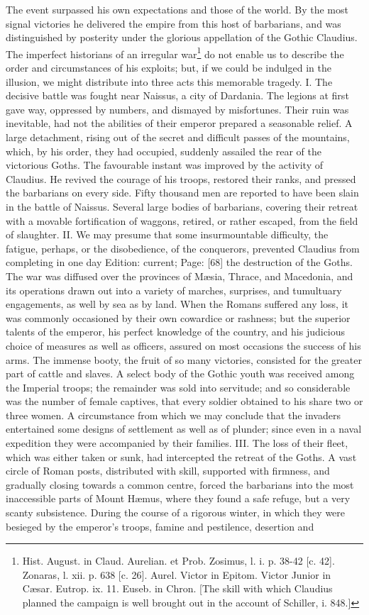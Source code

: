 The event surpassed his own expectations and those of the world. By the most signal victories he delivered the empire from this host of barbarians, and was distinguished by posterity under the glorious appellation of the Gothic Claudius. The imperfect historians of an irregular war\footnote{Hist. August. in Claud. Aurelian. et Prob. Zosimus, l. i. p. 38-42 [c. 42]. Zonaras, l. xii. p. 638 [c. 26]. Aurel. Victor in Epitom. Victor Junior in Cæsar. Eutrop. ix. 11. Euseb. in Chron. [The skill with which Claudius planned the campaign is well brought out in the account of Schiller, i. 848.]} do not enable us to describe the order and circumstances of his exploits; but, if we could be indulged in the illusion, we might distribute into three acts this memorable tragedy. I. The decisive battle was fought near Naissus, a city of Dardania. The legions at first gave way, oppressed by numbers, and dismayed by misfortunes. Their ruin was inevitable, had not the abilities of their emperor prepared a seasonable relief. A large detachment, rising out of the secret and difficult passes of the mountains, which, by his order, they had occupied, suddenly assailed the rear of the victorious Goths. The favourable instant was improved by the activity of Claudius. He revived the courage of his troops, restored their ranks, and pressed the barbarians on every side. Fifty thousand men are reported to have been slain in the battle of Naissus. Several large bodies of barbarians, covering their retreat with a movable fortification of waggons, retired, or rather escaped, from the field of slaughter. II. We may presume that some insurmountable difficulty, the fatigue, perhaps, or the disobedience, of the conquerors, prevented Claudius from completing in one day Edition: current; Page: [68] the destruction of the Goths. The war was diffused over the provinces of Mæsia, Thrace, and Macedonia, and its operations drawn out into a variety of marches, surprises, and tumultuary engagements, as well by sea as by land. When the Romans suffered any loss, it was commonly occasioned by their own cowardice or rashness; but the superior talents of the emperor, his perfect knowledge of the country, and his judicious choice of measures as well as officers, assured on most occasions the success of his arms. The immense booty, the fruit of so many victories, consisted for the greater part of cattle and slaves. A select body of the Gothic youth was received among the Imperial troops; the remainder was sold into servitude; and so considerable was the number of female captives, that every soldier obtained to his share two or three women. A circumstance from which we may conclude that the invaders entertained some designs of settlement as well as of plunder; since even in a naval expedition they were accompanied by their families. III. The loss of their fleet, which was either taken or sunk, had intercepted the retreat of the Goths. A vast circle of Roman posts, distributed with skill, supported with firmness, and gradually closing towards a common centre, forced the barbarians into the most inaccessible parts of Mount Hæmus, where they found a safe refuge, but a very scanty subsistence. During the course of a rigorous winter, in which they were besieged by the emperor\texthebrew{}’s troops, famine and pestilence, desertion and 